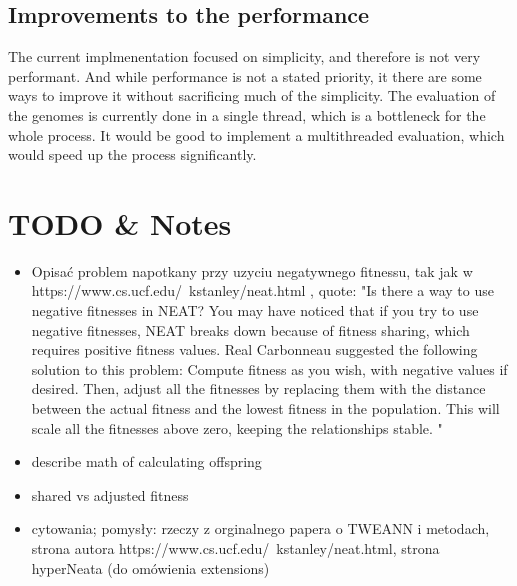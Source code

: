 \documentclass{article}
\begin{document}
        \subsection{Improvements to the performance}
        The current implmenentation focused on simplicity, and therefore is not very performant. And while performance
        is not a stated priority, it there are some ways to improve it without sacrificing much of the simplicity.
        The evaluation of the genomes is currently done in a single thread, which is a bottleneck for the whole process.
        It would be good to implement a multithreaded evaluation, which would speed up the process significantly.
\section{TODO \& Notes}
\begin{itemize}
    \item Opisać problem napotkany przy uzyciu negatywnego fitnessu, tak jak w https://www.cs.ucf.edu/~kstanley/neat.html , quote:
"Is there a way to use negative fitnesses in NEAT?
You may have noticed that if you try to use negative fitnesses, NEAT breaks down because of fitness sharing, which requires positive fitness values.
Real Carbonneau suggested the following solution to this problem: Compute fitness as you wish, with negative values if desired. Then, adjust all the fitnesses by replacing them with the distance between the actual fitness and the lowest fitness in the population. This will scale all the fitnesses above zero, keeping the relationships stable. "
\item describe math of calculating offspring
\item shared vs adjusted fitness
\item cytowania; pomysły: rzeczy z orginalnego papera o TWEANN i metodach, strona autora https://www.cs.ucf.edu/~kstanley/neat.html, strona hyperNeata (do omówienia extensions)
\end{itemize}

\end{document}
